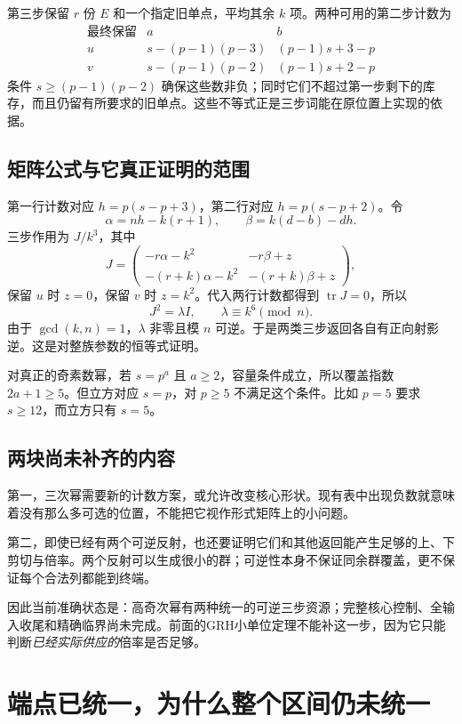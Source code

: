 \documentclass[11pt,a4paper,oneside,openany]{book}
\theoremstyle{definition}\newtheorem{example}[theorem]{例}\newtheorem{conjecture}[theorem]{猜想}
\numberwithin{equation}{chapter}\setcounter{tocdepth}{1}
\begin{document}
第三步保留 $r$ 份 $E$ 和一个指定旧单点，平均其余 $k$ 项。两种可用的第二步计数为
\[
\begin{array}{c|cc}
\text{最终保留}&a&b\\\hline
u&s-(p-1)(p-3)&(p-1)s+3-p\\
v&s-(p-1)(p-2)&(p-1)s+2-p
\end{array}
\]
条件 $s\ge(p-1)(p-2)$ 确保这些数非负；同时它们不超过第一步剩下的库存，而且仍留有所要求的旧单点。这些不等式正是三步词能在原位置上实现的依据。

\section{矩阵公式与它真正证明的范围}
第一行计数对应 $h=p(s-p+3)$，第二行对应 $h=p(s-p+2)$。令
\[\alpha=nh-k(r+1),\qquad\beta=k(d-b)-dh.
\]
三步作用为 $J/k^3$，其中
\[
J=\begin{pmatrix}
-r\alpha-k^2&-r\beta+z\\
-(r+k)\alpha-k^2&-(r+k)\beta+z
\end{pmatrix},
\]
保留 $u$ 时 $z=0$，保留 $v$ 时 $z=k^2$。代入两行计数都得到 $\operatorname{tr}J=0$，所以
\[J^2=\lambda I,\qquad \lambda\equiv k^6\pmod n.
\]
由于 $\gcd(k,n)=1$，$\lambda$ 非零且模 $n$ 可逆。于是两类三步返回各自有正向射影逆。这是对整族参数的恒等式证明。

对真正的奇素数幂，若 $s=p^a$ 且 $a\ge2$，容量条件成立，所以覆盖指数 $2a+1\ge5$。但立方对应 $s=p$，对 $p\ge5$ 不满足这个条件。比如 $p=5$ 要求 $s\ge12$，而立方只有 $s=5$。

\section{两块尚未补齐的内容}
第一，三次幂需要新的计数方案，或允许改变核心形状。现有表中出现负数就意味着没有那么多可选的位置，不能把它视作形式矩阵上的小问题。

第二，即使已经有两个可逆反射，也还要证明它们和其他返回能产生足够的上、下剪切与倍率。两个反射可以生成很小的群；可逆性本身不保证同余群覆盖，更不保证每个合法列都能到终端。

因此当前准确状态是：高奇次幂有两种统一的可逆三步资源；完整核心控制、全输入收尾和精确临界尚未完成。前面的GRH小单位定理不能补这一步，因为它只能判断\emph{已经实际供应的}倍率是否足够。


\chapter{端点已统一，为什么整个区间仍未统一}\label{ch:intervals}
\end{document}
